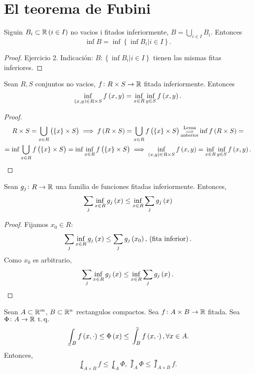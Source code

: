 \section{El teorema de Fubini}

\begin{lema*}
    Siguin $B_i \subset \mathbb{R} \left( i\in I\right)$ no vacios i fitados inferiormente, $B = \bigcup_{i\in I} B_i$. Entonces
    \[ \inf B = \inf\left\{\inf B_i | i\in I\right\}.\]
\end{lema*}
\begin{proof}
    Ejercicio 2. Indicación: $B \colon \left\{ \inf B_i | i\in I\right\}$ tienen las mismas fitas inferiores.
\end{proof}
\begin{lema}\label{lema:2_6_1}
    Sean $R, S$ conjuntos no vacios, $f \colon R\times S \to \mathbb{R}$ fitada inferiormente. Entonces
    \[ \inf_{\left( x,y\right)\in R\times S} f\left( x,y\right) = \inf_{x\in R}\inf_{y\in S} f\left( x,y\right). \]
\end{lema}
\begin{proof}
    \begin{gather*}
        R\times S = \bigcup_{x\in R} \left( \left\{x\right\}\times S\right) \implies f\left( R\times S\right) = \bigcup_{x\in R} f\left(\left\{ x\right\} \times S\right) \substack{\text{Lema}\\ \implies\\ \text{anterior}} \inf f\left( R\times S \right) = \\ = \inf \bigcup_{x\in R} f\left( \left\{x\right\} \times S\right) = \inf \inf_{x\in R} f\left( \left\{x\right\} \times S\right) \implies \inf_{\left( x,y\right) \in R\times S} f\left( x,y\right) = \inf_{x\in R} \inf_{y\in S} f\left( x,y\right).
    \end{gather*}
\end{proof}
\begin{lema}\label{lema:2_6_2}
    Sean $g_j \colon R \to \mathbb{R}$ una familia de funciones fitadas inferiormente. Entonces,
    \[ \sum_j \inf_{x\in R} g_j\left( x\right) \leq \inf_{x\in R} \sum_j g_j\left( x\right) \]
\end{lema}
\begin{proof}
    Fijamos $x_0 \in R:$
    \[ \sum_j \inf_{x\in R} g_j\left( x\right) \leq \sum_j g_j \left( x_0\right), \,\left(\text{fita inferior}\right). \]
    Como $x_0$ es arbitrario,
    \[ \sum_j \inf_{x\in R} g_j\left( x\right) \leq \inf_{x\in R} \sum_j g_j\left( x\right). \]
\end{proof}
\begin{lema}\label{lema:fubin_exp}
    Sean $A \subset \mathbb{R}^m$, $B \subset \mathbb{R}^n$ rectangulos compactos. Sea $f \colon A\times B\to\mathbb{R}$ fitada. Sea $\Phi \colon A\to\mathbb{R} \operatorname{\;t.q.\;}$
    \[ \lowint_B f\lp x,\cdot\rp\leq\Phi\lp x\rp\leq\upint_B f\lp x,\cdot\rp, \forall x\in A. \]
    Entonces,
    \[ \lowint_{A\times B} f \leq \lowint_A \Phi, \, \upint_A \Phi \leq \upint_{A\times B} f. \]
\end{lema}
